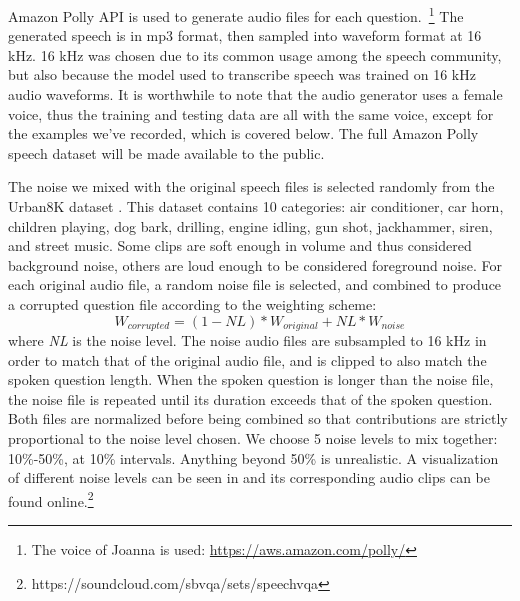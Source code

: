 \documentclass[letterpaper]{article} %
\begin{document}
Amazon Polly API is used to generate audio files for each question.~\footnote{The voice of Joanna is used: \url{https://aws.amazon.com/polly/}} The generated speech is in mp3 format, then sampled into waveform format at 16 kHz. 16 kHz was chosen due to its common usage among the speech community, but also because the model used to transcribe speech was trained on 16 kHz audio waveforms. It is worthwhile to note that the audio generator uses a female voice, thus the training and testing data are all with the same voice, except for the examples we’ve recorded, which is covered below. The full Amazon Polly speech dataset will be made available to the public.

The noise we mixed with the original speech files is selected randomly from the Urban8K dataset . This dataset contains 10 categories: air conditioner, car horn, children playing, dog bark, drilling, engine idling, gun shot, jackhammer, siren, and street music. Some clips are soft enough in volume and thus considered background noise, others are loud enough to be considered foreground noise. For each original audio file, a random noise file is selected, and combined to produce a corrupted question file according to the weighting scheme:
\begin{displaymath}
  W_{corrupted} = (1-\mathit{NL})*W_{original}  + \mathit{NL}*W_{noise}
\end{displaymath}
where \textit{NL} is the noise level. The noise audio files are subsampled to 16 kHz in order to match that of the original audio file, and is clipped to also match the spoken question length. When the spoken question is longer than the noise file, the noise file is repeated until its duration exceeds that of the spoken question. Both files are normalized before being combined so that contributions are strictly proportional to the noise level chosen. We choose 5 noise levels to mix together: 10\%-50\%, at 10\% intervals. Anything beyond 50\% is unrealistic. A visualization of different noise levels can be seen in  and its corresponding audio clips can be found online.\footnote{https://soundcloud.com/sbvqa/sets/speechvqa}
\end{document}

